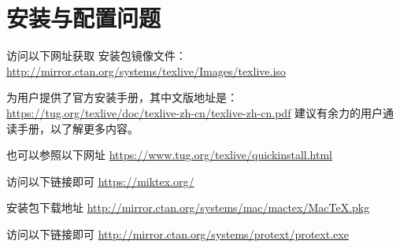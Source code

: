%
%
%
%

\section{安装与配置问题}
\label{sec:install}


%



访问以下网址获取 \TeXLive{} 安装包镜像文件：
\url{http://mirror.ctan.org/systems/texlive/Images/texlive.iso}


\TeXLive{} 为用户提供了官方安装手册，其中文版地址是：
\url{https://tug.org/texlive/doc/texlive-zh-cn/texlive-zh-cn.pdf}
建议有余力的用户通读手册，以了解更多内容。

也可以参照以下网址 \url{https://www.tug.org/texlive/quickinstall.html}


访问以下链接即可 \url{https://miktex.org/}


\MacTeX{} 安装包下载地址 \url{http://mirror.ctan.org/systems/mac/mactex/MacTeX.pkg}



访问以下链接即可 \url{http://mirror.ctan.org/systems/protext/protext.exe}



